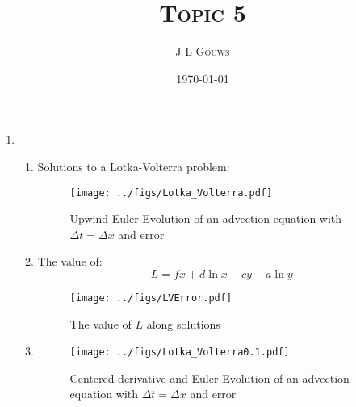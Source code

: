 \documentclass[12pt,a4]{article}
\title{
\textsc{Topic 5}
}
\author{\textsc{J L Gouws}
}
\date{\today
\\[1cm]}
\begin{document}
\thispagestyle{empty}

\maketitle

\begin{enumerate}
  \item
    \begin{enumerate}
      \item
        Solutions to a Lotka-Volterra problem:
        \begin{figure}[!h]
          \centering
          \texttt{[image: ../figs/Lotka\_Volterra.pdf]} 
          \caption{Upwind Euler Evolution of an advection equation with $\Delta t = \Delta x$ and error}
        \end{figure}

      \item
        The value of:
        \begin{equation*}
          L = f x + d \ln x - cy - a \ln y
        \end{equation*}

        \begin{figure}[!h]
          \centering
          \texttt{[image: ../figs/LVError.pdf]}
          \caption{The value of $L$ along solutions}
        \end{figure}

      \item
        \begin{figure}[!h]
          \centering
          \texttt{[image: ../figs/Lotka\_Volterra0.1.pdf]}
          \caption{Centered derivative and Euler Evolution of an advection equation  with $\Delta t = \Delta x$ and error}
        \end{figure}

    \end{enumerate}
\end{enumerate}
\end{document}
